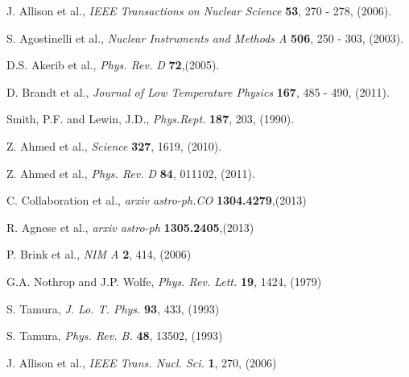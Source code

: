 \documentclass[preprint,12pt]{elsarticle}
\begin{document}
%
%
\begin{thebibliography}{99}

J. Allison et al., {\it IEEE Transactions on Nuclear Science} \textbf{53}, 270 - 278, (2006).

S. Agostinelli et al., {\it Nuclear Instruments and Methods A} \textbf{506}, 250 - 303, (2003).

D.S. Akerib et al., {\it Phys. Rev. D} \textbf{72},(2005).

D. Brandt et al., {\it Journal of Low Temperature Physics} \textbf{167}, 485 - 490, (2011).

Smith, P.F. and Lewin, J.D., {\it Phys.Rept.} \textbf{187}, 203, (1990).


Z. Ahmed et al., {\it Science} \textbf{327}, 1619, (2010).

Z. Ahmed et al., {\it Phys. Rev. D} \textbf{84}, 011102, (2011).

C. Collaboration et al., {\it arxiv astro-ph.CO} \textbf{1304.4279},(2013)

R. Agnese et al., {\it arxiv astro-ph} \textbf{1305.2405},(2013)





P. Brink et al., {\it NIM A} \textbf{2}, 414, (2006)


G.A. Nothrop and J.P. Wolfe, {\it Phys. Rev. Lett.} \textbf{19}, 1424, (1979)

S. Tamura, {\it J. Lo. T. Phys.} \textbf{93}, 433, (1993)

S. Tamura, {\it Phys. Rev. B.} \textbf{48}, 13502, (1993)

J. Allison et al., {\it IEEE Trans. Nucl. Sci.} \textbf{1}, 270, (2006)



\end{thebibliography}
\end{document}
